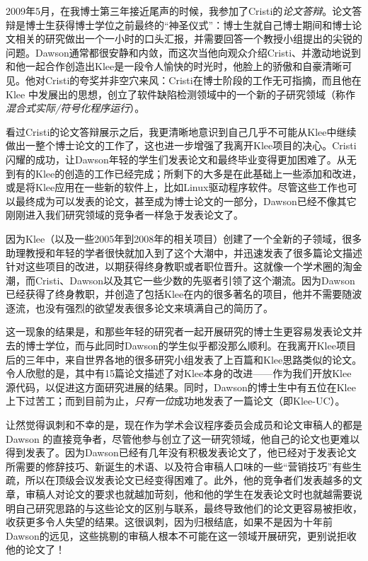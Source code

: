 \documentclass[letter,12pt]{book}
\begin{document}
\begin{CJK}{UTF8}{gbsn}
\breakline

2009年5月，在我博士第三年接近尾声的时候，我参加了Cristi的\emph{论文答辩}。论文答辩是博士生获得博士学位之前最终的“神圣仪式”：博士生就自己博士期间和博士论文相关的研究做出一个一小时的口头汇报，并需要回答一个教授小组提出的尖锐的问题。Dawson通常都很安静和内敛，而这次当他向观众介绍Cristi、并激动地说到和他一起合作创造出Klee是一段令人愉快的时光时，他脸上的骄傲和自豪清晰可见。他对Cristi的夸奖并非空穴来风：Cristi在博士阶段的工作无可指摘，而且他在Klee 中发展出的思想，创立了软件缺陷检测领域中的一个新的子研究领域（称作\emph{混合式实际/符号化程序运行}）。

看过Cristi的论文答辩展示之后，我更清晰地意识到自己几乎不可能从Klee中继续做出一整个博士论文的工作了，这也进一步增强了我离开Klee项目的决心。Cristi 闪耀的成功，让Dawson年轻的学生们发表论文和最终毕业变得更加困难了。从无到有的Klee的创造的工作已经完成；所剩下的大多是在此基础上一些添加和改进，或是将Klee应用在一些新的软件上，比如Linux驱动程序软件。尽管这些工作也可以最终成为可以发表的论文，甚至成为博士论文的一部分，Dawson已经不像其它刚刚进入我们研究领域的竞争者一样急于发表论文了。

因为Klee（以及一些2005年到2008年的相关项目）创建了一个全新的子领域，很多助理教授和年轻的学者很快就加入到了这个大潮中，并迅速发表了很多篇论文描述针对这些项目的改进，以期获得终身教职或者职位晋升。这就像一个学术圈的淘金潮，而Cristi、Dawson以及其它一些少数的先驱者引领了这个潮流。因为Dawson已经获得了终身教职，并创造了包括Klee在内的很多著名的项目，他并不需要随波逐流，也没有强烈的欲望发表很多论文来填满自己的简历了。

这一现象的结果是，和那些年轻的研究者一起开展研究的博士生更容易发表论文并去的博士学位，而与此同时Dawson的学生似乎都没那么顺利。在我离开Klee项目后的三年中，来自世界各地的很多研究小组发表了上百篇和Klee思路类似的论文。令人欣慰的是，其中有15篇论文描述了对Klee本身的改进——作为我们开放Klee 源代码，以促进这方面研究进展的结果。同时，Dawson的博士生中有五位在Klee上下过苦工；而到目前为止，\emph{只有一位}成功地发表了一篇论文（即Klee-UC）。

让然觉得讽刺和不幸的是，现在作为学术会议程序委员会成员和论文审稿人的都是Dawson 的直接竞争者，尽管他参与创立了这一研究领域，他自己的论文也更难以得到发表了。因为Dawson已经有几年没有积极发表论文了，他已经对于发表论文所需要的修辞技巧、新诞生的术语、以及符合审稿人口味的一些“营销技巧”有些生疏，所以在顶级会议发表论文已经变得困难了。此外，他的竞争者们发表越多的文章，审稿人对论文的要求也就越加苛刻，他和他的学生在发表论文时也就越需要说明自己研究思路的与这些论文的区别与联系，最终导致他们的论文更容易被拒收，收获更多令人失望的结果。这很讽刺，因为归根结底，如果不是因为十年前Dawson的远见，这些挑剔的审稿人根本不可能在这一领域开展研究，更别说拒收他的论文了！


\end{CJK}
\end{document}
